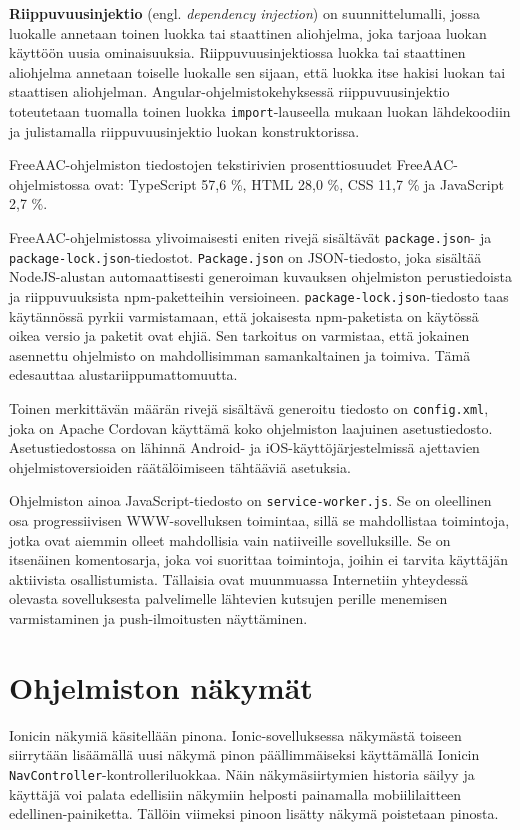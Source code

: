 \documentclass[utf8]{gradu3}
\begin{document}
\textbf{Riippuvuusinjektio} (engl. \textit{dependency injection}) on suunnittelumalli, jossa luokalle annetaan toinen luokka tai staattinen aliohjelma, joka tarjoaa luokan käyttöön uusia ominaisuuksia. Riippuvuusinjektiossa luokka tai staattinen aliohjelma annetaan toiselle luokalle sen sijaan, että luokka itse hakisi luokan tai staattisen aliohjelman. Angular-ohjelmistokehyksessä riippuvuusinjektio toteutetaan tuomalla toinen luokka \texttt{import}-lauseella mukaan luokan lähdekoodiin ja julistamalla riippuvuusinjektio luokan konstruktorissa.

FreeAAC-ohjelmiston tiedostojen tekstirivien prosenttiosuudet FreeAAC-ohjelmistossa ovat: TypeScript 57,6 \%, HTML 28,0 \%, CSS 11,7 \% ja JavaScript 2,7 \%.

FreeAAC-ohjelmistossa ylivoimaisesti eniten rivejä sisältävät \texttt{package.json}- ja \texttt{package-lock.json}-tiedostot. \texttt{Package.json} on JSON-tiedosto, joka sisältää NodeJS-alustan automaattisesti generoiman kuvauksen ohjelmiston perustiedoista ja riippuvuuksista npm-paketteihin versioineen. \texttt{package-lock.json}-tiedosto taas käytännössä pyrkii varmistamaan, että jokaisesta npm-paketista on käytössä oikea versio ja paketit ovat ehjiä. Sen tarkoitus on varmistaa, että jokainen asennettu ohjelmisto on mahdollisimman samankaltainen ja toimiva. Tämä edesauttaa alustariippumattomuutta.

Toinen merkittävän määrän rivejä sisältävä generoitu tiedosto on \texttt{config.xml}, joka on Apache Cordovan käyttämä koko ohjelmiston laajuinen asetustiedosto. Asetustiedostossa on lähinnä Android- ja iOS-käyttöjärjestelmissä ajettavien ohjelmistoversioiden räätälöimiseen tähtääviä asetuksia.

Ohjelmiston ainoa JavaScript-tiedosto on \texttt{service-worker.js}. Se on oleellinen osa progressiivisen WWW-sovelluksen toimintaa, sillä se mahdollistaa toimintoja, jotka ovat aiemmin olleet mahdollisia vain natiiveille sovelluksille. Se on itsenäinen komentosarja, joka voi suorittaa toimintoja, joihin ei tarvita käyttäjän aktiivista osallistumista. Tällaisia ovat muunmuassa Internetiin yhteydessä olevasta sovelluksesta palvelimelle lähtevien kutsujen perille menemisen varmistaminen ja push-ilmoitusten näyttäminen.

\section{Ohjelmiston näkymät}

Ionicin näkymiä käsitellään pinona. Ionic-sovelluksessa näkymästä toiseen siirrytään lisäämällä uusi näkymä pinon päällimmäiseksi käyttämällä Ionicin \texttt{NavController}-kontrolleriluokkaa. Näin näkymäsiirtymien historia säilyy ja käyttäjä voi palata edellisiin näkymiin helposti painamalla mobiililaitteen edellinen-painiketta. Tällöin viimeksi pinoon lisätty näkymä poistetaan pinosta.
\end{document}

